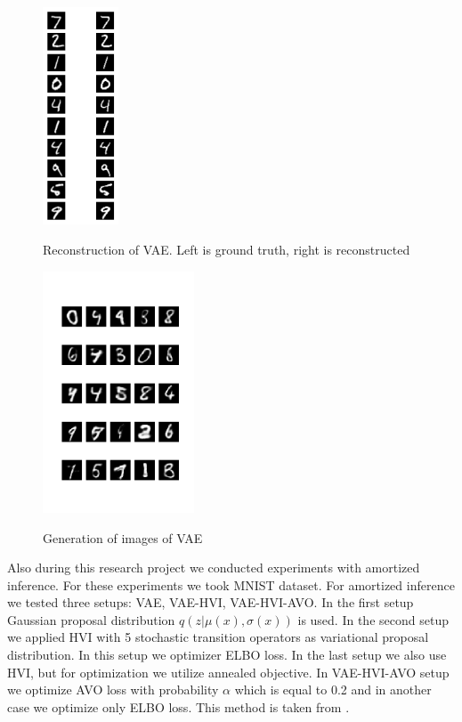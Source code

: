\documentclass{article}
\begin{document}
\begin{figure}
    \caption{Reconstruction of VAE. Left is ground truth, right is reconstructed}
    \centering
    \includegraphics[width=0.2\textwidth]{images/reconstruction.png}
    \label{fig:vae_reconstruction}
\end{figure}

\begin{figure}
    \caption{Generation of images of VAE}
    \centering
    \includegraphics[width=0.4\textwidth]{images/generation_vae_hvi.png}
    \label{fig:vae_generation}
\end{figure}

Also during this research project we conducted experiments with amortized inference. For these experiments we took MNIST dataset. For amortized inference we tested three setups: VAE, VAE-HVI, VAE-HVI-AVO. In the first setup Gaussian proposal distribution $q(z|\mu(x), \sigma(x))$ is used. In the second setup we applied HVI with 5 stochastic transition operators as variational proposal distribution. In this setup we optimizer ELBO loss. In the last setup we also use HVI, but for optimization we utilize annealed objective. In VAE-HVI-AVO setup we optimize AVO loss with probability $\alpha$ which is equal to 0.2 and in another case we optimize only ELBO loss. This method is taken from \cite{main_Huang2018ImprovingEI}.
\end{document}
